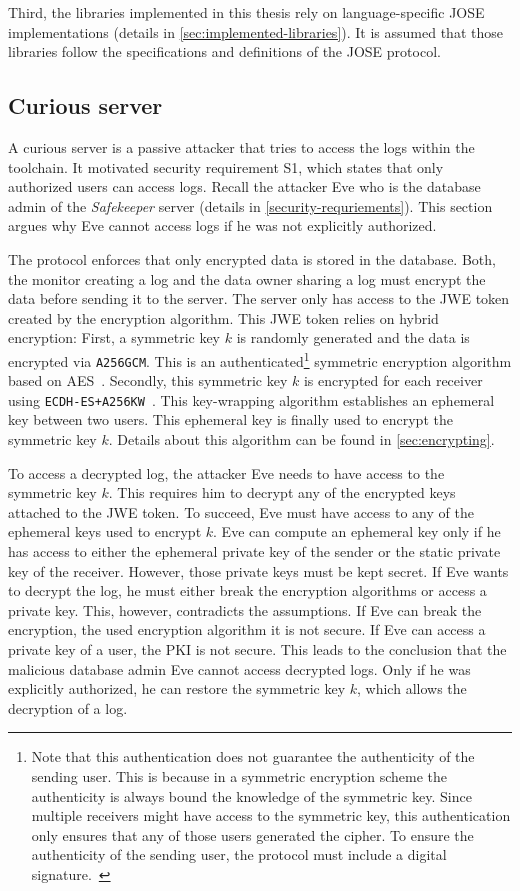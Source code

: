 \documentclass[../main.tex]{subfiles}
\begin{document}
Third, the libraries implemented in this thesis rely on language-specific JOSE implementations (details in \cref{sec:implemented-libraries}).
It is assumed that those libraries follow the specifications and definitions of the JOSE protocol.

\subsection{Curious server}
A curious server is a passive attacker that tries to access the logs within the toolchain.
It motivated security requirement S1, which states that only authorized users can access logs.
Recall the attacker Eve who is the database admin of the \emph{Safekeeper} server (details in \cref{security-requriements}).
This section argues why Eve cannot access logs if he was not explicitly authorized.

The protocol enforces that only encrypted data is stored in the database.
Both, the monitor creating a log and the data owner sharing a log must encrypt the data before sending it to the server.
The server only has access to the JWE token created by the encryption algorithm.
This JWE token relies on hybrid encryption:
First, a symmetric key $k$ is randomly generated and the data is encrypted via \verb|A256GCM|.
This is an authenticated\footnote{Note that this authentication does not guarantee the authenticity of the sending user. This is because in a symmetric encryption scheme the authenticity is always bound the knowledge of the symmetric key. Since multiple receivers might have access to the symmetric key, this authentication only ensures that any of those users generated the cipher. To ensure the authenticity of the sending user, the protocol must include a digital signature.~\cite[315]{Eckert2018}} symmetric encryption algorithm based on AES~\cite{JWA2015}.
Secondly, this symmetric key $k$ is encrypted for each receiver using \verb|ECDH-ES+A256KW|~\cite{JWA2015}.
This key-wrapping algorithm establishes an ephemeral key between two users.
This ephemeral key is finally used to encrypt the symmetric key $k$.
Details about this algorithm can be found in \cref{sec:encrypting}.

To access a decrypted log, the attacker Eve needs to have access to the symmetric key $k$.
This requires him to decrypt any of the encrypted keys attached to the JWE token.
To succeed, Eve must have access to any of the ephemeral keys used to encrypt $k$.
Eve can compute an ephemeral key only if he has access to either the ephemeral private key of the sender or the static private key of the receiver.
However, those private keys must be kept secret.
If Eve wants to decrypt the log, he must either break the encryption algorithms or access a private key.
This, however, contradicts the assumptions.
If Eve can break the encryption, the used encryption algorithm it is not secure.
If Eve can access a private key of a user, the PKI is not secure.
This leads to the conclusion that the malicious database admin Eve cannot access decrypted logs.
Only if he was explicitly authorized, he can restore the symmetric key $k$, which allows the decryption of a log.
\end{document}

